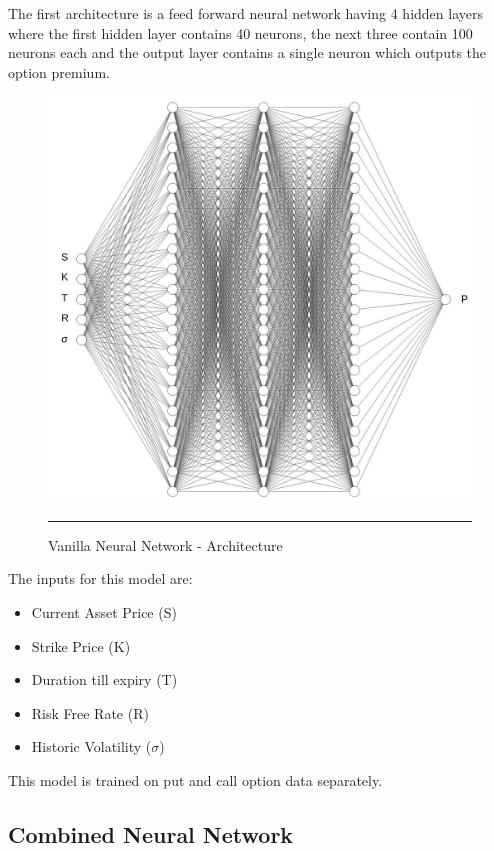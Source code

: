 The first architecture is a feed forward neural network having 4 hidden layers where the first hidden layer contains 40 neurons, the next three contain 100 neurons each and the output layer contains a single neuron which outputs the option premium.

\begin{figure}[htbp]
  \centering
    \includegraphics[scale=0.45]{Figures/model_1_vnn.jpg}
    \rule{35em}{0.5pt}
  \caption[Vanilla Neural Network - Architecture]{Vanilla Neural Network - Architecture}
  \label{fig:model_1_vnn}
\end{figure}

The inputs for this model are:
\begin{itemize}[noitemsep,topsep=0pt]
    \item Current Asset Price (S)
    \item Strike Price (K)
    \item Duration till expiry (T)
    \item Risk Free Rate (R)
    \item Historic Volatility ($\sigma$)
\end{itemize}

This model is trained on put and call option data separately. 


\subsection{Combined Neural Network}

